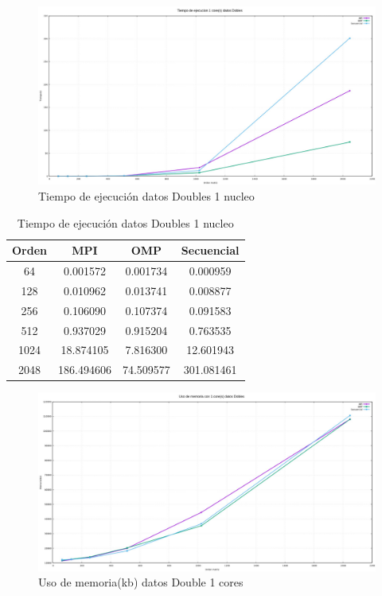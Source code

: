 \documentclass[10pt]{IEEEtran}
\begin{document}
\begin{figure}[H]
  \centering
  \includegraphics[width=0.95\linewidth]{figs/1nucleoDoblesTiempo.jpeg}
  \caption{Tiempo de ejecución datos Doubles 1 nucleo}
  \label{fig:do}
\end{figure}

\begin{table}[H]
  \caption{Tiempo de ejecución datos Doubles 1 nucleo}
  \label{table_example}
  \centering
  \begin{tabular}{|c|c|c|c|}
    \hline
    \textbf{Orden} & \textbf{MPI} & \textbf{OMP} & \textbf{Secuencial} \\
    \hline
    64 & 0.001572 & 0.001734 & 0.000959 \\
    128 & 0.010962 & 0.013741 & 0.008877 \\
    256 & 0.106090 & 0.107374 & 0.091583 \\
    512 & 0.937029 & 0.915204 & 0.763535 \\
    1024 & 18.874105 & 7.816300 & 12.601943 \\
    2048 & 186.494606 & 74.509577 & 301.081461 \\
    \hline
  \end{tabular}
\end{table}

\begin{figure}[H]
  \centering
  \includegraphics[width=0.95\linewidth]{figs/1nucleoDoblesMemoria.jpeg}
  \caption{Uso de memoria(kb) datos Double 1 cores}
  \label{fig:do2}
\end{figure}
\end{document}
